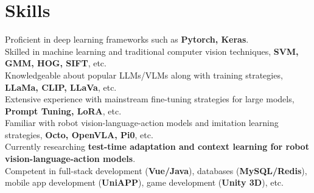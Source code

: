 \documentclass{resume}
\newcommand{\faBox}[2][c]{%
   \makebox[0.8em][#1]{%
      \csname fa#2\endcsname
   }%
}
\begin{document}
\section{\faBox[c]{CodeFork} Skills}

Proficient in deep learning frameworks such as \textbf{Pytorch, Keras}. \\
Skilled in machine learning and traditional computer vision techniques, \textbf{SVM, GMM, HOG, SIFT}, etc. \\
Knowledgeable about popular LLMs/VLMs along with training strategies, \textbf{LLaMa, CLIP, LLaVa}, etc. \\
Extensive experience with mainstream fine-tuning strategies for large models, \textbf{Prompt Tuning, LoRA}, etc. \\
Familiar with robot vision-language-action models and imitation learning strategies, \textbf{Octo, OpenVLA, Pi0}, etc. \\
Currently researching \textbf{test-time adaptation and context learning for robot vision-language-action models}. \\
Competent in full-stack development (\textbf{Vue/Java}), databases (\textbf{MySQL/Redis}), mobile app development (\textbf{UniAPP}), game development (\textbf{Unity 3D}), etc.
\end{document}
